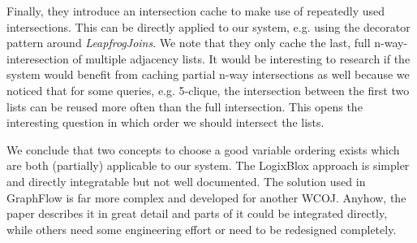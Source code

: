 Finally, they introduce an intersection cache to make use of repeatedly used intersections.
This can be directly applied to our system, e.g. using the decorator pattern around \textit{LeapfrogJoins}.
We note that they only cache the last, full n-way-interesection of multiple adjacency lists.
It would be interesting to research if the system would benefit from caching partial n-way intersections as well because
we noticed that for some queries, e.g. 5-clique, the intersection between the first two lists can be reused more often than the full
intersection.
This opens the interesting question in which order we should intersect the lists.

We conclude that two concepts to choose a good variable ordering exists which are both (partially) applicable to our system.
The LogixBlox approach is simpler and directly integratable but not well documented.
The solution used in GraphFlow is far more complex and developed for another \textsc{WCOJ}.
Anyhow, the paper describes it in great detail and parts of it could be integrated directly, while others need some engineering effort or
need to be redesigned completely.








